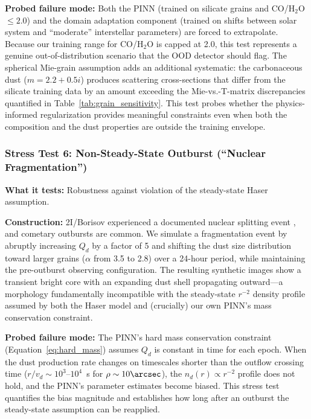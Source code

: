 \documentclass[usenatbib]{mnras}
\begin{document}
\textbf{Probed failure mode:} Both the PINN (trained on silicate grains and CO/H$_2$O $\leq 2.0$) and the domain adaptation component (trained on shifts between solar system and ``moderate'' interstellar parameters) are forced to extrapolate. Because our training range for CO/H$_2$O is capped at 2.0, this test represents a genuine out-of-distribution scenario that the OOD detector should flag. The spherical Mie-grain assumption adds an additional systematic: the carbonaceous dust ($m = 2.2 + 0.5i$) produces scattering cross-sections that differ from the silicate training data by an amount exceeding the Mie-vs.-T-matrix discrepancies quantified in Table~\ref{tab:grain_sensitivity}. This test probes whether the physics-informed regularization provides meaningful constraints even when both the composition and the dust properties are outside the training envelope.

\subsubsection{Stress Test 6: Non-Steady-State Outburst (``Nuclear Fragmentation'')}

\textbf{What it tests:} Robustness against violation of the steady-state Haser assumption.

\textbf{Construction:} 2I/Borisov experienced a documented nuclear splitting event \citep{jewitt20}, and cometary outbursts are common. We simulate a fragmentation event by abruptly increasing $Q_d$ by a factor of 5 and shifting the dust size distribution toward larger grains ($\alpha$ from 3.5 to 2.8) over a 24-hour period, while maintaining the pre-outburst observing configuration. The resulting synthetic images show a transient bright core with an expanding dust shell propagating outward---a morphology fundamentally incompatible with the steady-state $r^{-2}$ density profile assumed by both the Haser model and (crucially) our own PINN's mass conservation constraint.

\textbf{Probed failure mode:} The PINN's hard mass conservation constraint (Equation~\ref{eq:hard_mass}) assumes $Q_d$ is constant in time for each epoch. When the dust production rate changes on timescales shorter than the outflow crossing time ($r/v_d \sim 10^3$--$10^4$~s for $\rho \sim 10\arcsec$), the $n_d(r) \propto r^{-2}$ profile does not hold, and the PINN's parameter estimates become biased. This stress test quantifies the bias magnitude and establishes how long after an outburst the steady-state assumption can be reapplied.
\end{document}
